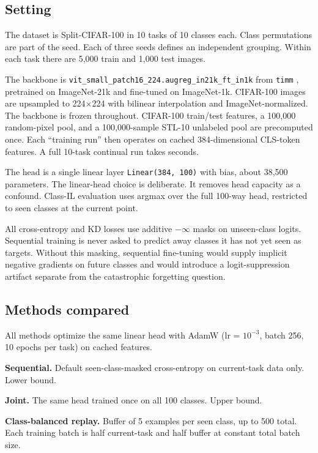 \documentclass[conference]{IEEEtran}
\begin{document}
\subsection{Setting}

The dataset is Split-CIFAR-100 in 10 tasks of 10 classes each. Class
permutations are part of the seed. Each of three seeds defines an
independent grouping. Within each task there are 5{,}000 train and 1{,}000
test images.

The backbone is \texttt{vit\_small\_patch16\_224.augreg\_in21k\_ft\_in1k}
from \texttt{timm} \citep{wightman2019timm}, pretrained on ImageNet-21k
and fine-tuned on ImageNet-1k. CIFAR-100 images are upsampled to
224$\times$224 with bilinear interpolation and ImageNet-normalized. The
backbone is frozen throughout. CIFAR-100 train/test features, a 100{,}000
random-pixel pool, and a 100{,}000-sample STL-10 unlabeled pool are
precomputed once. Each ``training run'' then operates on cached
384-dimensional CLS-token features. A full 10-task continual run takes
seconds.

The head is a single linear layer \texttt{Linear(384, 100)} with bias,
about 38{,}500 parameters. The linear-head choice is deliberate. It removes
head capacity as a confound. Class-IL evaluation uses argmax over the full
100-way head, restricted to seen classes at the current point.

All cross-entropy and KD losses use additive $-\infty$ masks on
unseen-class logits. Sequential training is never asked to predict away
classes it has not yet seen as targets. Without this masking, sequential
fine-tuning would supply implicit negative gradients on future classes and
would introduce a logit-suppression artifact separate from the catastrophic
forgetting question.

\subsection{Methods compared}

All methods optimize the same linear head with AdamW (lr = $10^{-3}$, batch
256, 10 epochs per task) on cached features.

\textbf{Sequential.} Default seen-class-masked cross-entropy on
current-task data only. Lower bound.

\textbf{Joint.} The same head trained once on all 100 classes. Upper
bound.

\textbf{Class-balanced replay.} Buffer of 5 examples per seen class, up
to 500 total. Each training batch is half current-task and half buffer at
constant total batch size.
\end{document}

